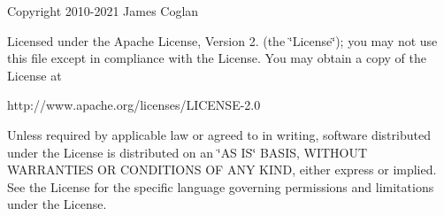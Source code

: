 Copyright 2010-\/2021 James Coglan

Licensed under the Apache License, Version 2. (the \char`\"{}\+License\char`\"{}); you may not use this file except in compliance with the License. You may obtain a copy of the License at \begin{DoxyVerb}http://www.apache.org/licenses/LICENSE-2.0
\end{DoxyVerb}
 Unless required by applicable law or agreed to in writing, software distributed under the License is distributed on an \char`\"{}\+AS IS\char`\"{} BASIS, WITHOUT WARRANTIES OR CONDITIONS OF ANY KIND, either express or implied. See the License for the specific language governing permissions and limitations under the License. 